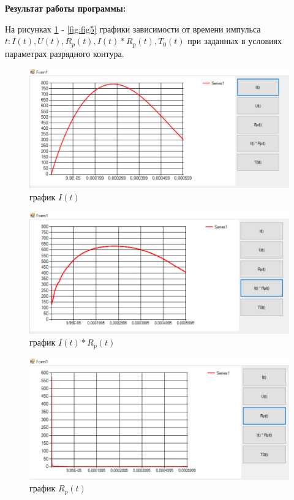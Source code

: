\hspace{0cm} \textbf{Результат работы программы:}

На рисунках \ref{fig:fig1} - \ref{fig:fig5} графики зависимости от времени импульса $t: I(t),U(t),R_p(t),I(t)*R_p(t),T_0(t)$ при заданных в условиях параметрах разрядного контура.

\begin{figure}[ht!]
  \centering
  \includegraphics[scale=0.8]{img/I(t).png}
  \caption{график $I(t)$}
  \label{fig:fig1}
\end{figure}

\newpage

\begin{figure}[ht!]
  \centering
  \includegraphics[scale=0.8]{img/I(t)Rp(t).png}
  \caption{график $I(t)*R_p(t)$}
  \label{fig:fig2}
\end{figure}

\begin{figure}[ht!]
  \centering
  \includegraphics[scale=0.8]{img/Rp(t).png}
  \caption{график $R_p(t)$}
  \label{fig:fig3}
\end{figure}

